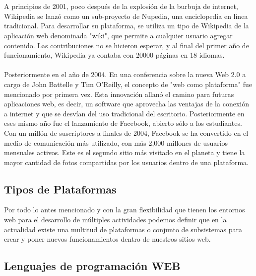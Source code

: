 \begin{large}
\\
\\
A principios de 2001, poco después de la explosión de la burbuja de internet, Wikipedia se lanzó como un sub-proyecto de Nupedia, una enciclopedia en línea tradicional. Para desarrollar su plataforma, se utiliza un tipo de Wikipedia de la aplicación web denominada "wiki", que permite a cualquier usuario agregar contenido. Las contribuciones no se hicieron esperar, y al final del primer año de funcionamiento, Wikipedia ya contaba con 20000 páginas en 18 idiomas. 
\\
\\
Posteriormente en el año de 2004. En una conferencia  sobre la nueva Web 2.0 a cargo de John Battelle y Tim O'Reilly, el concepto de "web como plataforma" fue mencionado por primera vez. Esta innovación allanó el camino para futuras aplicaciones web, es decir, un software que aprovecha las ventajas de la conexión a internet y que se desvían del uso tradicional del escritorio. 
Posteriormente en eses mismo año fue el lanzamiento de Facebook, abierto sólo a los estudiantes. Con un millón de suscriptores a finales de 2004, Facebook se ha convertido en el medio de comunicación más utilizado, con más 2,000 millones de usuarios mensuales activos. Este es el segundo sitio más visitado en el planeta y tiene la mayor cantidad de fotos compartidas por los usuarios dentro de una plataforma. 

\subsection{Tipos de Plataformas}

Por todo lo antes mencionado y con la gran flexibilidad que tienen los entornos web para el desarrollo de múltiples actividades podemos definir que en la actualidad existe una multitud de plataformas o conjunto de subsistemas para crear y poner nuevos funcionamientos dentro de nuestros sitios web. 


\subsection{Lenguajes de programación WEB}


\end{large}
